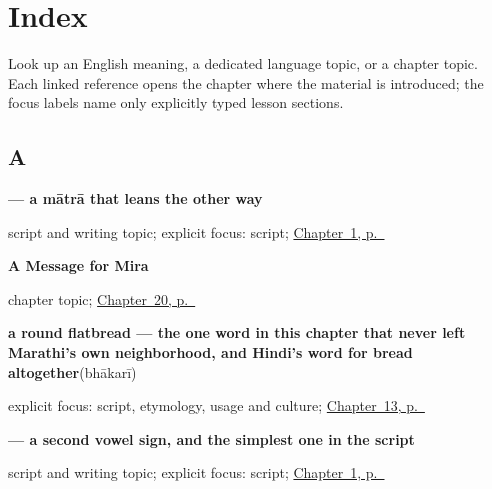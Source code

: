 
\chapter*{Index}

Look up an English meaning, a dedicated language topic, or a chapter topic. Each linked reference opens the chapter where the material is introduced; the focus labels name only explicitly typed lesson sections.

\section*{A}

\noindent\begin{minipage}[t]{\linewidth}
\raggedright
\textbf{ — a mātrā that leans the other way}\par
\footnotesize script and writing topic; explicit focus: script; \hyperref[ch:first-greeting-script]{Chapter~1, p.~\pageref*{ch:first-greeting-script}}
\end{minipage}\par\smallskip

\noindent\begin{minipage}[t]{\linewidth}
\raggedright
\textbf{A Message for Mira}\par
\footnotesize chapter topic; \hyperref[ch:mr-a1-named-reader-message]{Chapter~20, p.~\pageref*{ch:mr-a1-named-reader-message}}
\end{minipage}\par\smallskip

\noindent\begin{minipage}[t]{\linewidth}
\raggedright
\textbf{a round flatbread — the one word in this chapter that never left Marathi's own neighborhood, and Hindi's word for bread altogether}\enspace\emph{}\enspace(bhākarī)\par
\footnotesize explicit focus: script, etymology, usage and culture; \hyperref[ch:mr-request-food-drink]{Chapter~13, p.~\pageref*{ch:mr-request-food-drink}}
\end{minipage}\par\smallskip

\noindent\begin{minipage}[t]{\linewidth}
\raggedright
\textbf{ — a second vowel sign, and the simplest one in the script}\par
\footnotesize script and writing topic; explicit focus: script; \hyperref[ch:first-greeting-script]{Chapter~1, p.~\pageref*{ch:first-greeting-script}}
\end{minipage}\par\smallskip

